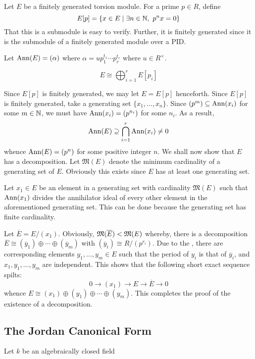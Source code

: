 Let $E$ be a finitely generated torsion module. For a prime $p\in R$, define
\begin{equation*}
    E[p] = \{x\in E\mid\exists n\in\mathbb{N},~p^nx = 0\}
\end{equation*}
That this is a submodule is easy to verify. Further, it is finitely generated since it is the submodule of a finitely generated module over a PID. 

Let $\operatorname{Ann}(E) = (\alpha)$ where $\alpha = up_1^{t_1}\cdots p_r^{t_r}$ where $u\in R^\times$.

\begin{lemma}
    \begin{equation*}
        E\cong\bigoplus_{i = 1}^r E[p_i]
    \end{equation*}
\end{lemma}

Since $E[p]$ is finitely generated, we may let $E = E[p]$ henceforth. Since $E[p]$ is finitely generated, take a generating set $\{x_1,\ldots,x_n\}$. Since $(p^m)\subseteq\operatorname{Ann}(x_i)$ for some $m\in\mathbb{N}$, we must have $\operatorname{Ann}(x_i) = (p^{n_i})$ for some $n_i$. As a result, 
\begin{equation*}
    \operatorname{Ann}(E)\supseteq\bigcap_{i = 1}^r\operatorname{Ann}(x_i)\ne 0
\end{equation*}
whence $\operatorname{Ann}(E) = (p^{n})$ for some positive integer $n$. We shall now show that $E$ has a decomposition. Let $\mathfrak M(E)$ denote the minimum cardinality of a generating set of $E$. Obviously this exists since $E$ has at least one generating set.

Let $x_1\in E$ be an element in a generating set with cardinality $\mathfrak M(E)$ such that $\operatorname{Ann}(x_1)$ divides the annihilator ideal of every other element in the aforementioned generating set. This can be done because the generating set has finite cardinality. 

Let $\overline E = E/(x_1)$. Obviously, $\mathfrak{M}(\overline E) < \mathfrak{M}(E)$ whereby, there is a decomposition $\overline E\cong (\overline y_1)\oplus\cdots\oplus(\overline y_m)$ with $(\overline y_i)\cong R/(p^{r_i})$. Due to the , there are corresponding elements $y_1,\ldots,y_m\in E$ such that the period of $y_i$ is that of $\overline y_i$, and $x_1,y_1,\ldots,y_m$ are independent. This shows that the following short exact sequence spilts: 
\begin{equation*}
    0\rightarrow(x_1)\rightarrow E\rightarrow\overline E\rightarrow 0
\end{equation*}
whence $E\cong(x_1)\oplus(y_1)\oplus\cdots\oplus(y_m)$. This completes the proof of the existence of a decomposition.

\subsection{The Jordan Canonical Form}

Let $k$ be an algebraically closed field 